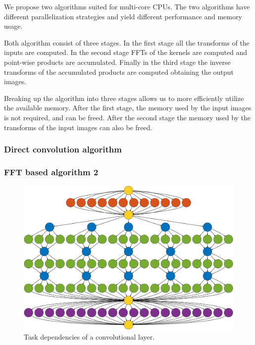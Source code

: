 \documentclass[conference]{IEEEtran}
\begin{document}
We propose two algorithms suited for multi-core CPUs.  The two
algorithms have different parallelization strategies and yield
different performance and memory usage.

Both algorithm consist of three stages.  In the first stage all the
transforms of the inputs are computed.  In the second stage FFTs of
the kernels are computed and point-wise products are accumulated.
Finally in the third stage the inverse transforms of the accumulated
products are computed obtaining the output images.

Breaking up the algorithm into three stages allows us to more
efficiently utilize the available memory.  After the first stage, the
memory used by the input images is not required, and can be freed.
After the second stage the memory used by the transforms of the input
images can also be freed.

\subsubsection{Direct convolution algorithm}


\subsubsection{FFT based algorithm 2}

\begin{figure}
  \begin{center}
  \includegraphics[width=0.95\columnwidth]{fig/deps}
  \end{center}
  \caption{Task dependencies of a convolutional layer.}
  \label{fig:task_deps}
\end{figure}
\end{document}
